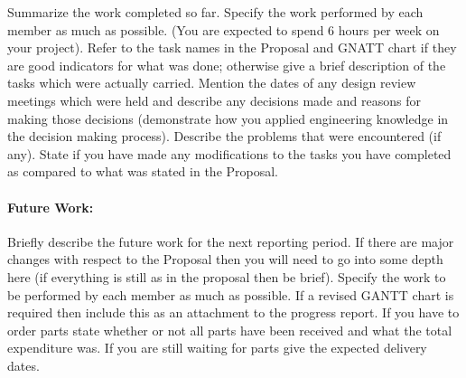 Summarize the work completed so far. Specify the work performed by each member as much as
possible. (You are expected to spend 6 hours per week on your project).
Refer to the task names in the Proposal and GNATT chart if they are good indicators for what was done;
otherwise give a brief description of the tasks which were actually carried.
Mention the dates of any design review meetings which were held and describe any decisions made and
reasons for making those decisions (demonstrate how you applied engineering knowledge in the
decision making process).
Describe the problems that were encountered (if any). State if you have made any modifications to the
tasks you have completed as compared to what was stated in the Proposal.


\paragraph{Future Work:}

Briefly describe the future work for the next reporting period. If there are major changes with respect to
the Proposal then you will need to go into some depth here (if everything is still as in the proposal then
be brief). Specify the work to be performed by each member as much as possible.
If a revised GANTT chart is required then include this as an attachment to the progress report.
If you have to order parts state whether or not all parts have been received and what the total
expenditure was. If you are still waiting for parts give the expected delivery dates.




